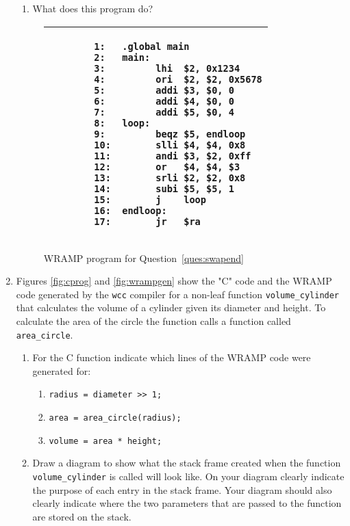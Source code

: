 \documentclass[a4paper,10pt]{article}
\begin{document}
\begin{enumerate}
\begin{enumerate}
\item What does this program do?
\end{enumerate}

\begin{figure}[h]
\begin{footnotesize}
\begin{center}
\begin{tabular}{|p{10cm}|}
\hline
\begin{verbatim}
        1:   .global main
        2:   main:
        3:         lhi  $2, 0x1234
        4:         ori  $2, $2, 0x5678
        5:         addi $3, $0, 0
        6:         addi $4, $0, 0
        7:         addi $5, $0, 4
        8:   loop:    
        9:         beqz $5, endloop
        10:        slli $4, $4, 0x8
        11:        andi $3, $2, 0xff
        12:        or   $4, $4, $3
        13:        srli $2, $2, 0x8
        14:        subi $5, $5, 1
        15:        j    loop
        16:  endloop: 
        17:        jr   $ra
\end{verbatim}
\\
\hline
\end{tabular}
\end{center}
\end{footnotesize}
\caption{WRAMP program for Question~\ref{ques:swapend}}
\label{fig:swapend}
\end{figure}

\item 
\label{ques:cprog}

Figures \ref{fig:cprog} and \ref{fig:wrampgen} show the "C" code and
the WRAMP code generated by the \texttt{wcc} compiler for a non-leaf
function \verb+volume_cylinder+ that calculates the volume of a
cylinder given its diameter and height. To calculate the area of the
circle the function calls a function called \verb+area_circle+.

\begin{enumerate}
  \item For the C function indicate which lines of the WRAMP code were
  generated for:
  \begin{enumerate}
   \item \verb+radius = diameter >> 1;+
   \item \verb+area = area_circle(radius);+
   \item \verb+volume = area * height;+
  \end{enumerate}


  \item Draw a diagram to show what the stack frame created when the
  function \verb+volume_cylinder+ is called will look like. On your
  diagram clearly indicate the purpose of each entry in the stack
  frame. Your diagram should also clearly indicate where the two
  parameters that are passed to the function are stored on the stack.
\end{enumerate}


\end{enumerate}
\end{document}
